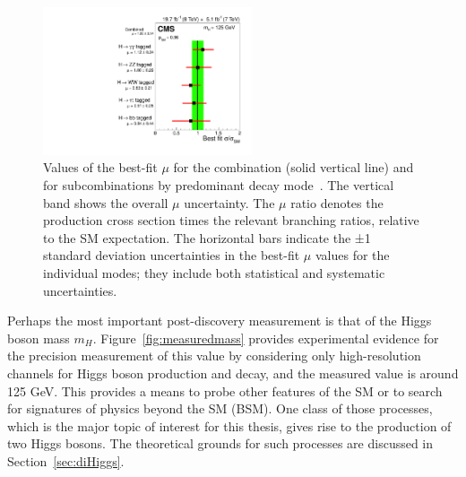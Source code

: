 \begin{figure}[ht]
 \begin{center}
    \includegraphics[width=0.55\textwidth]{figures/intro/sqr_mlz_ccc_mH125_decay.pdf}
      \end{center}
\caption{Values of the best-fit $\mu$ for the combination (solid vertical line) and for subcombinations by predominant decay mode~\cite{Khachatryan:1979247}. The vertical band shows the overall $\mu$ uncertainty. The $\mu$ ratio denotes the production cross section times the relevant branching ratios, relative to the SM expectation. The horizontal bars indicate the ±1 standard deviation uncertainties in the best-fit $\mu$ values for the individual modes; they include both statistical and systematic uncertainties.}
\label{fig:measuredxsec_decay}
\end{figure}

Perhaps the most important post-discovery measurement is that of the Higgs boson mass $m_H$.
Figure~\ref{fig:measuredmass} provides experimental evidence for the precision measurement of this
value by considering only high-resolution channels for Higgs boson production and decay, and
the measured value is around 125 GeV. This provides a means to probe other features of the SM
or to search for signatures of physics beyond the SM (BSM). One class of those processes, which
is the major topic of interest for this thesis, gives rise to the production of two Higgs bosons.
The theoretical grounds for such processes are discussed in
Section~\ref{sec:diHiggs}.


